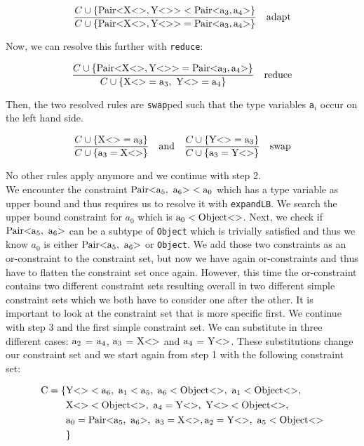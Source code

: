 \begin{align*}
    \frac{C \cup \{ \text{Pair} \text{<} \text{X} \text{<}  \text{>}, \text{Y} \text{<}  \text{>} \text{>} < \text{Pair} \text{<} \text{a}_{3}, \text{a}_{4} \text{>} \} }{C \cup \{ \text{Pair} \text{<} \text{X} \text{<}  \text{>}, \text{Y} \text{<}  \text{>} \text{>} = \text{Pair} \text{<} \text{a}_{3}, \text{a}_{4} \text{>} \} } \quad \text{adapt}
\end{align*}

Now, we can resolve this further with \verb|reduce|:

\begin{align*}
    \frac{\cand \{ \nvtt{Pair}{\nvtt{X}{}, \nvtt{Y}{}} = \nvtt{Pair}{\fa{3}, \fa{4}} \} }{\cand \{ \nvtt{X}{} = \fa{3}, \ \nvtt{Y}{} = \fa{4} \} } \quad \text{reduce}
\end{align*}

Then, the two resolved rules are \verb|swap|ped such that the type variables \verb|a|$_i$ occur on the left hand side.

\begin{align*}
    \frac{C \cup \{ \text{X} \text{<}  \text{>} = \text{a}_{3} \} }{C \cup \{ \text{a}_{3} = \text{X} \text{<}  \text{>} \} } \quad \text{and} \quad \frac{C \cup \{ \text{Y} \text{<}  \text{>} = \text{a}_{3} \} }{C \cup \{ \text{a}_{3} = \text{Y} \text{<}  \text{>} \} } \quad \text{swap}
\end{align*}

No other rules apply anymore and we continue with step 2.\\

We encounter the constraint $\text{Pair} \text{<} \text{a}_{5}, \ \text{a}_{6} \text{>} < \text{a}_{0}$ which has a type variable as upper bound and thus requires us to resolve it with \verb|expandLB|. We search the upper bound constraint for $a_0$ which is $\text{a}_{0} < \text{Object} \text{<}  \text{>}$.
Next, we check if $\nvtt{Pair}{\fa{5}, \ \fa{6}}$ can be a subtype of \verb|Object| which is trivially satisfied and thus we know $a_0$ is either $\nvtt{Pair}{\fa{5}, \ \fa{6}}$ or \verb|Object|. We add those two constraints as an or-constraint
to the constraint set, but now we have again or-constraints and thus have to flatten the constraint set once again. However, this time the or-constraint contains two different constraint sets resulting overall in two different simple constraint sets which we both have to consider one after the other.
It is important to look at the constraint set that is more specific first. We continue with step 3 and the first simple constraint set. We can substitute in three different cases: $\text{a}_{2}$ = $\text{a}_{4}$, $\text{a}_{3}$ = $\text{X} \text{<}  \text{>}$ and $\text{a}_{4}$ = $\text{Y} \text{<}  \text{>}$.
These substitutions change our constraint set and we start again from step 1 with the following constraint set:

\begin{align*}
    \text{C} = \{& \nvtt{Y}{} < \fa{6}, \ \fa{1} < \fa{5}, \ \fa{6} < \nvtt{Object}{}, \ \fa{1} < \nvtt{Object}{}, \\
    &\nvtt{X}{} < \nvtt{Object}{}, \ \fa{4} = \nvtt{Y}{}, \ \nvtt{Y}{} < \nvtt{Object}{}, \\
    &\fa{0} = \nvtt{Pair}{\fa{5}, \ \fa{6}}, \ \fa{3} = \nvtt{X}{}, \fa{2} = \nvtt{Y}{}, \ \fa{5} < \nvtt{Object}{} \\
    &\}
\end{align*}


